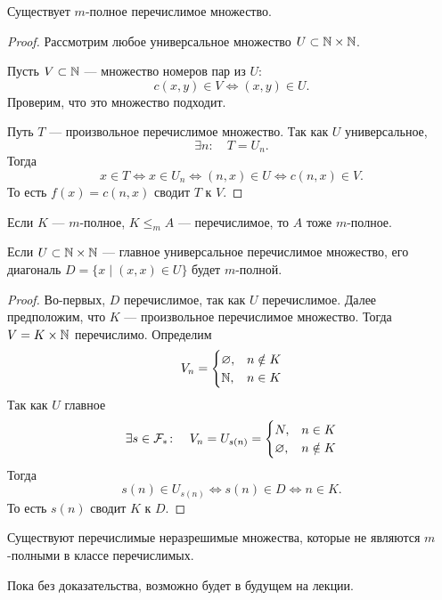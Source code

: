 \begin{thm}
    Существует $ m$-полное перечислимое множество.
\end{thm}
\begin{proof}
    Рассмотрим любое универсальное множество $ U \subset \mathbb{N} \times \mathbb{N}$.

	Пусть $ V \subset \mathbb{N}$ --- множество номеров пар из  $ U$:
	 \[
		 c(x, y) \in V  \Longleftrightarrow (x, y) \in U
	.\] 
	Проверим, что это множество подходит.

	Путь $ T$ --- произвольное перечислимое множество. Так как $ U$ универсальное, 
	\[
	\exists n \colon \quad T = U_n
	.\] 
	Тогда
	\[
		x \in T \Longleftrightarrow x \in U_n \Longleftrightarrow (n, x) \in U \Longleftrightarrow  c(n, x) \in V
	.\] 
	То есть $ f(x) = c(n, x)$ сводит $ T $ к $ V$.
\end{proof}


\begin{note}
    Если $ K$ --- $ m$-полное,  $ K \le _{m} A$ --- перечислимое, то $ A$ тоже $ m$-полное. 
\end{note}


\begin{thm}
	Если $ U \subset \mathbb{N} \times \mathbb{N}$ --- главное универсальное перечислимое множество, его диагональ $ D = \{x \mid (x, x) \in  U\}$ будет $ m$-полной.
\end{thm}
\begin{proof}
    Во-первых, $ D$ перечислимое, так как $ U$ перечислимое. 
	Далее предположим, что $ K$ --- произвольное перечислимое множество. Тогда $ V = K \times \mathbb{N}$  перечислимо. Определим
	\[
	V_n = \begin{cases}
		\varnothing, & n \notin K \\
		\mathbb{N} , & n \in K
	\end{cases}
	\] 
	Так как $ U$ главное 
	$$ \exists s \in \mathcal{F}_{*}\colon\quad V_n=U_{s(n)} = \begin{cases}
		N, &n \in K \\
		\varnothing, & n \notin K
	\end{cases}
	$$
	Тогда 
	\[
		s(n) \in U_{s(n)} \Longleftrightarrow s(n) \in D \Longleftrightarrow n \in K
	.\] 
	То есть $ s(n)$ сводит  $ K $ к $ D$.
\end{proof}


\begin{st}
	Существуют перечислимые неразрешимые множества, которые не являются $ m$-полными в классе перечислимых.
\end{st}
\begin{proof*}
    Пока без доказательства, возможно будет в будущем на лекции.
\end{proof*}



